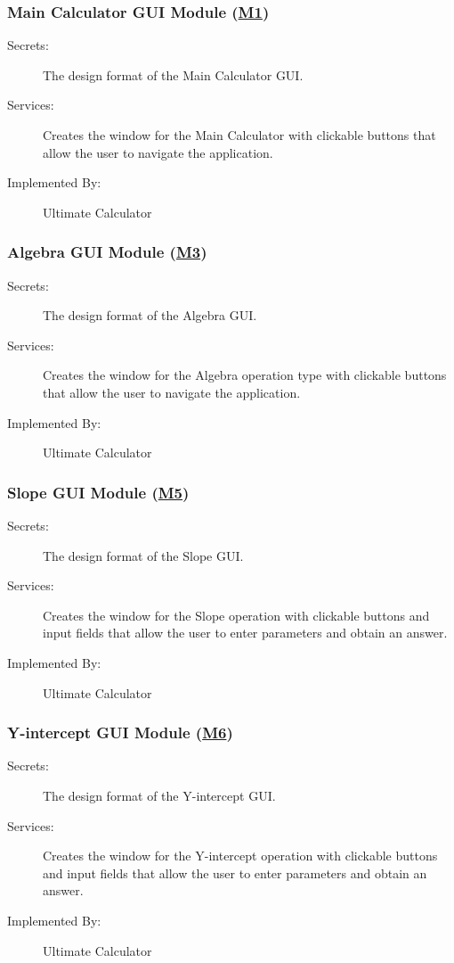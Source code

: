 \documentclass[12pt, titlepage]{article}
\begin{document}
\subsubsection{Main Calculator GUI Module (\hyperref[m1]{M1})}

\begin{description}
\item[Secrets:]The design format of the Main Calculator GUI.
\item[Services:] Creates the window for the Main Calculator with clickable buttons that allow the user to navigate the application.
\item[Implemented By:] Ultimate Calculator
\end{description}

\subsubsection{Algebra GUI Module (\hyperref[m3]{M3})}

\begin{description}
\item[Secrets:]The design format of the Algebra GUI.
\item[Services:] Creates the window for the Algebra operation type with clickable buttons that allow the user to navigate the application.
\item[Implemented By:] Ultimate Calculator
\end{description}

\subsubsection{Slope GUI Module (\hyperref[m5]{M5})}

\begin{description}
\item[Secrets:]The design format of the Slope GUI.
\item[Services:] Creates the window for the Slope operation with clickable buttons and input fields that allow the user to enter parameters and obtain an answer.
\item[Implemented By:] Ultimate Calculator
\end{description}

\subsubsection{Y-intercept GUI Module (\hyperref[m6]{M6})}

\begin{description}
\item[Secrets:]The design format of the Y-intercept GUI.
\item[Services:] Creates the window for the Y-intercept operation with clickable buttons and input fields that allow the user to enter parameters and obtain an answer.
\item[Implemented By:] Ultimate Calculator
\end{description}
\end{document}
